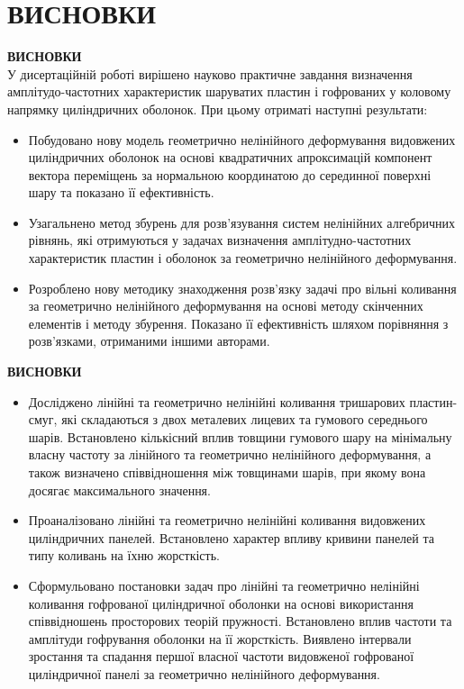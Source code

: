 \documentclass[8pt]{beamer}
\numberwithin{figure}{section}
\numberwithin{equation}{section}
\numberwithin{table}{section}
\begin{document}
\section{ВИСНОВКИ}
\begin{frame}
\textbf{\large ВИСНОВКИ}
\\
\vspace{0.2em}
У дисертаційній роботі вирішено науково практичне завдання визначення амплітудо-частотних характеристик шаруватих пластин і гофрованих у коловому напрямку циліндричних оболонок. При цьому отриматі наступні результати:
\begin{itemize}
\item Побудовано нову модель геометрично нелінійного деформування видовжених циліндричних оболонок на основі квадратичних апроксимацій компонент вектора переміщень за нормальною координатою до серединної поверхні шару та показано її ефективність.
\item Узагальнено метод збурень для розв'язування систем нелінійних алгебричних рівнянь, які отримуються у задачах визначення амплітудно-частотних характеристик пластин і оболонок за геометрично нелінійного деформування.
\item Розроблено нову методику знаходження розв’язку задачі про вільні коливання за геометрично нелінійного деформування на основі методу скінченних елементів і методу збурення. Показано її ефективність шляхом порівняння з розв'язками, отриманими іншими авторами.
\end{itemize}
\end{frame}
\begin{frame}
\textbf{\large ВИСНОВКИ}
\\
\vspace{1em}
\begin{itemize}
\item Досліджено лінійні та геометрично нелінійні коливання тришарових пластин-смуг, які складаються з двох металевих лицевих та гумового середнього шарів.  Встановлено кількісний вплив товщини гумового шару на мінімальну власну частоту за лінійного та геометрично нелінійного деформування, а також визначено співвідношення між товщинами шарів, при якому вона досягає максимального значення. 
\item Проаналізовано лінійні та геометрично нелінійні коливання видовжених циліндричних панелей. Встановлено характер впливу кривини панелей та типу коливань на їхню жорсткість. 
\item Сформульовано постановки задач про лінійні та геометрично нелінійні коливання гофрованої циліндричної оболонки на основі використання співвідношень просторових теорій пружності. Встановлено вплив частоти та амплітуди гофрування оболонки на її жорсткість. Виявлено інтервали зростання та спадання першої власної частоти видовженої гофрованої циліндричної панелі за геометрично нелінійного деформування.

\end{itemize}



\end{frame}
\end{document}
